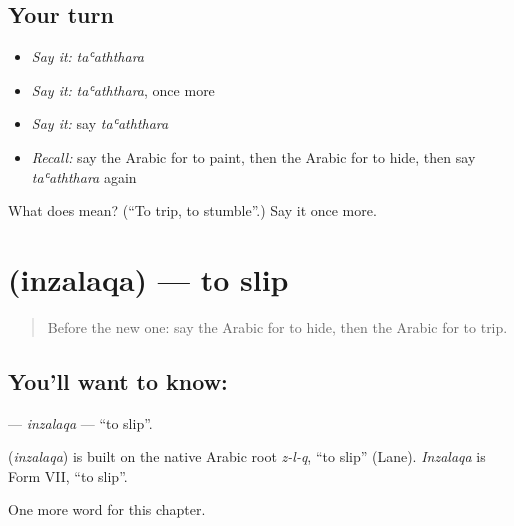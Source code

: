 \subsection*{Your turn}
\begin{itemize}
\raggedright
  \item \emph{Say it:} \emph{taʿaththara}
  \item \emph{Say it:} \emph{taʿaththara}, once more
  \item \emph{Say it:} say \emph{taʿaththara}
  \item \emph{Recall:} say the Arabic for to paint, then the Arabic for to hide, then say \emph{taʿaththara} again
\end{itemize}

\begin{tcolorbox}[breakable,colback=teal!4,colframe=teal!35!black,title={Before you move on}]
What does  mean? (\textquotedblleft{}To trip, to stumble\textquotedblright{}.) Say it once more.
\end{tcolorbox}
\section[\texorpdfstring{\ar{انزلق} (inzalaqa)}{انزلق (inzalaqa)}]{ (inzalaqa) — to slip}

\label{lesson:AR-C167-inzalaqa}



\begin{quote}
Before the new one: say the Arabic for to hide, then the Arabic for to trip.
\end{quote}

\subsection*{You'll want to know: }
\textbf{} — \emph{inzalaqa} — \textquotedblleft{}to slip\textquotedblright{}.

\begin{cousinweb}
\textbf{} (\emph{inzalaqa}) is built on the native Arabic root \emph{z-l-q}, \textquotedblleft{}to slip\textquotedblright{} (Lane). \emph{Inzalaqa} is Form VII, \textquotedblleft{}to slip\textquotedblright{}.
\end{cousinweb}

\begin{grammarlens}[title={What you've built}]
One more word for this chapter.
\end{grammarlens}

